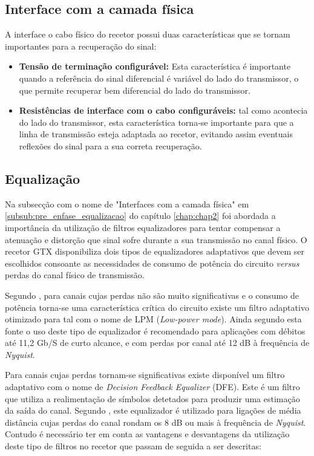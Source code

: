 \subsection{Interface com a camada física}

A interface o cabo físico do recetor possui duas características que se tornam importantes para a recuperação do sinal:
\begin{itemize}
	\item \textbf{Tensão de terminação configurável:} Esta característica é importante quando a referência do sinal diferencial é variável do lado do transmissor, o que permite recuperar bem diferencial do lado do transmissor.
	\item \textbf{Resistências de interface com o cabo configuráveis:} tal como acontecia do lado do transmissor, esta característica torna-se importante para que a linha de transmissão esteja adaptada ao recetor, evitando assim eventuais reflexões do sinal para a sua correta recuperação.


\end{itemize}


\subsection{Equalização}

Na subsecção com o nome de "Interfaces com a camada física" em \ref{subsub:pre_enfase_equalizacao} do capítulo \ref{chap:chap2} foi abordada a importância da utilização de filtros equalizadores para tentar compensar a atenuação e distorção que sinal sofre durante a sua transmissão no canal físico. O recetor GTX disponibiliza dois tipos de equalizadores adaptativos que devem ser escolhidos consoante as necessidades de consumo de potência do circuito \textit{versus} perdas do canal físico de transmissão.

Segundo \cite{R011}, para canais cujas perdas não são muito significativas e o consumo de potência torna-se uma característica crítica do circuito existe um filtro adaptativo otimizado para tal com o nome de LPM (\textit{Low-power mode}). Ainda segundo esta fonte o uso deste tipo de equalizador é recomendado para aplicações com débitos até 11,2 Gb/S de curto alcance, e com perdas por canal até 12 dB à frequência de \textit{Nyquist}.


Para canais cujas perdas tornam-se significativas existe disponível um filtro adaptativo com o nome de\textit{ Decision Feedback Equalizer} (DFE). Este é um filtro que utiliza a realimentação de símbolos detetados para produzir uma estimação da saída do canal. Segundo \cite{R011}, este equalizador é utilizado para ligações de média distância cujas perdas do canal rondam os 8 dB ou mais à frequência de \textit{Nyquist}. Contudo é necessário ter em conta as vantagens e desvantagens da utilização deste tipo de filtros no recetor que passam de seguida a ser descritas:

